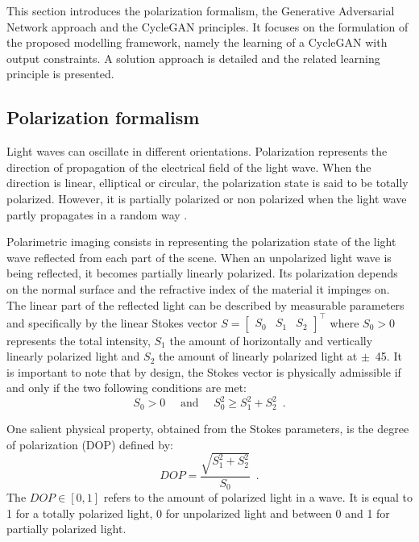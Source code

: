 This section introduces the polarization formalism, the Generative Adversarial Network approach and the CycleGAN principles. It focuses on the formulation of the proposed modelling framework, namely the learning of a CycleGAN with output constraints. A solution approach is detailed and the related learning principle is presented. 

\subsection{Polarization formalism}
\label{physical_prop}

Light waves can oscillate in different orientations. Polarization represents the direction of propagation of the electrical field of the light wave. When the direction is linear, elliptical or circular, the polarization state is said to be totally polarized. However, it is partially polarized or non polarized when the light wave partly propagates in a random way \citep{Bass1995}. 

Polarimetric imaging consists in representing the polarization state of the light wave reflected from each part of the scene. When an unpolarized light wave is being reflected, it becomes partially linearly polarized. Its polarization depends on the normal surface  and the refractive index of the material it impinges on. The linear part of the reflected light can be described by measurable parameters and specifically by the linear Stokes vector $S = \begin{bmatrix}
S_0 & S_1 & S_2 \end{bmatrix}^\top$ where $S_0>0$ represents the total intensity, $S_1$ the amount of horizontally and vertically linearly polarized light and $S_2$ the amount of linearly polarized light at $\pm$~45\degree. 
%
It is important to note that by design, the Stokes vector is physically admissible if and only if the two following conditions are met:  
%
\begin{equation}
S_0 > 0
\quad \mbox{ and } \quad 
S_0^2 \geqslant S_1^2 + S_2^2 \enspace.
\label{eqn:stokes_constraint_S0}
\end{equation}

One salient physical property, obtained from the Stokes parameters, is the degree of polarization (DOP) \citep{Ainouz2013}  defined by:
$$
DOP = \frac{\sqrt{S_1^2+S_2^2}}{S_0} \enspace.
$$
%
The $DOP \in [0,1]$ refers to the amount of polarized light in a wave. It is equal to 1 for a totally polarized light, 0 for unpolarized light and between 0 and 1 for partially polarized light.

